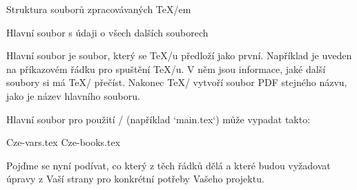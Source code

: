 

\sec Struktura souborů zpracovávaných \TeX/em

\secc[hlavni] Hlavní soubor s údaji o všech dalších souborech

Hlavní soubor je soubor, který se \TeX/u předloží jako první. Například je
uveden na příkazovém řádku pro spuštění \TeX/u. V něm jsou informace, jaké
další soubory si má \TeX/ přečíst. Nakonec \TeX/ vytvoří soubor PDF stejného
názvu, jako je název hlavního souboru.

Hlavní soubor pro použití \OpBible/ (například `main.tex`) může vypadat takto:

\begtt
\load[opbible]  %
\cslang          %

\def\tmark     {BKR}    %

 {Cze-vars.tex}   %
 {Cze-books.tex}  %

\def\txsfile     {sources/Cze\tmark-\amark.txs}     %
\def\fmtfile     {formats/fmt-Cze\tmark-\amark.tex} %
\def\notesfile   {notes/notes-\amark.tex}           %
\def\introfile   {others/intro-\amark.tex}          %
\def\articlefile {others/articles-\amark.tex}       %

\def\printedbooks {%
   Gn Ex Lv Nu Dt Joz Sd Rt 1Sa 2Sa 1Kr 2Kr 1Pa 2Pa Ezd Neh
   Est Jb Ž Př Kaz Pís Iz Jr Pl Ez Da Oz Jl Am Abd Jon Mi
   Na Abk Sf Ag Za Mal 
   Mt Mk Lk Jn Sk Ř 1K 2K Ga Ef Fp Ko 1Te 2Te 1Tm 2Tm 
   Tt Fm Žd Jk 1Pt 2Pt 1Jn 2Jn 3Jn Ju Zj
}
\processbooks %
\bye
\endtt

Pojďme se nyní podívat, co který z těch řádků dělá a které budou vyžadovat úpravy z Vaší strany pro konkrétní  potřeby Vašeho projektu.

